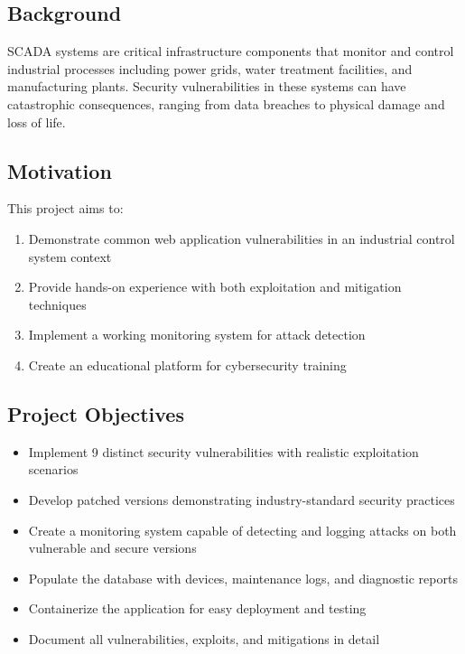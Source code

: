\documentclass[12pt,a4paper]{article}
\begin{document}
\subsection{Background}

SCADA systems are critical infrastructure components that monitor and control industrial processes including power grids, water treatment facilities, and manufacturing plants. Security vulnerabilities in these systems can have catastrophic consequences, ranging from data breaches to physical damage and loss of life.

\subsection{Motivation}

This project aims to:
\begin{enumerate}[leftmargin=*]
    \item Demonstrate common web application vulnerabilities in an industrial control system context
    \item Provide hands-on experience with both exploitation and mitigation techniques
    \item Implement a working monitoring system for attack detection
    \item Create an educational platform for cybersecurity training
\end{enumerate}

\subsection{Project Objectives}

\begin{itemize}[leftmargin=*]
    \item Implement 9 distinct security vulnerabilities with realistic exploitation scenarios
    \item Develop patched versions demonstrating industry-standard security practices
    \item Create a monitoring system capable of detecting and logging attacks on both vulnerable and secure versions
    \item Populate the database with devices, maintenance logs, and diagnostic reports
    \item Containerize the application for easy deployment and testing
    \item Document all vulnerabilities, exploits, and mitigations in detail
\end{itemize}
\end{document}
